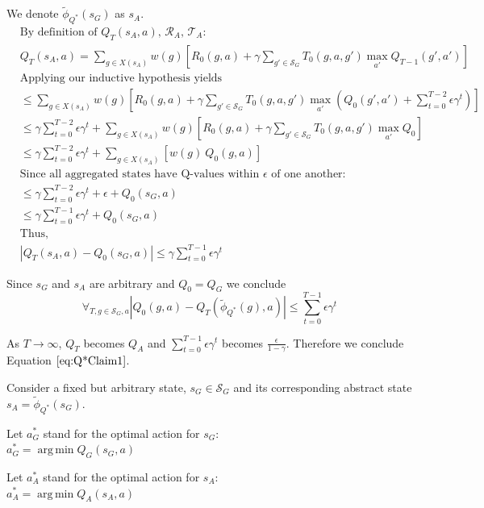 \documentclass{article}
\newcommand{\ep}{\widetilde \phi}
\newcommand{\epQ}{\ep_{Q^*}}
\DeclareMathOperator*{\argmin}{arg\,min}
\begin{document}
We denote $\epQ(s_G)$ as $s_A$.
\begin{align*}
&\text{By definition of $Q_{T}(s_A, a)$, $\mathcal{R}_A$, $\mathcal{T}_A$:}\\
&Q_T(s_A, a) =\sum_{g \in X(s_A)}w(g)\left[ R_0(g,a) + \gamma \sum_{g' \in \mathcal{S}_G} T_0(g,a,g') \max_{a'} Q_{T-1}(g', a')      \right]\\
&\text{Applying our inductive hypothesis yields}\\
&\leq \sum_{g \in X(s_A)}w(g)\left[ R_0(g,a) + \gamma \sum_{g' \in \mathcal{S}_G} T_0(g,a,g') \max_{a'}(Q_0(g', a') + \sum_{t=0}^{T-2} \epsilon \gamma^t)      \right]\\
&\leq \gamma\sum_{t=0}^{T-2} \epsilon \gamma^t + \sum_{g \in X(s_A)}w(g)\left[ R_0(g,a) + \gamma \sum_{g' \in \mathcal{S}_G} T_0(g,a,g') \max_{a'}Q_0      \right]\\
&\leq \gamma\sum_{t=0}^{T-2} \epsilon \gamma^t + \sum_{g \in X(s_A)}\left[ w(g)\ Q_0(g,a)\right]\\
&\text{Since all aggregated states have Q-values within $\epsilon$ of one another:}\\
&\leq \gamma\sum_{t=0}^{T-2} \epsilon \gamma^t + \epsilon + Q_0(s_G, a)\\
&\leq \gamma\sum_{t=0}^{T-1} \epsilon \gamma^t + Q_0(s_G, a)\\
&\text{Thus,}\\
&\left| Q_{T}(s_A, a) - Q_0(s_G,a) \right| \leq \gamma\sum_{t=0}^{T-1}\epsilon \gamma^t
\end{align*}

Since $s_G$ and $s_A$ are arbitrary and $Q_0=Q_G$ we conclude
\begin{equation}
\forall_{T, g \in \mathcal{S}_G, a} |Q_0(g, a) - Q_T(\epQ(g), a)| \leq \sum_{t=0}^{T-1} \epsilon \gamma^t
\end{equation}

As $T \rightarrow \infty$, $Q_T$ becomes $Q_A$ and $\sum_{t=0}^{T-1} \epsilon \gamma^t$ becomes $\frac{\epsilon}{1-\gamma}$. Therefore we conclude Equation $\ref{eq:Q*Claim1}$.

Consider a fixed but arbitrary state, $s_G \in \mathcal{S}_G$ and its corresponding abstract state $s_A=\epQ(s_G)$.

Let $a^*_G$ stand for the optimal action for $s_G$: \\
$a^*_G = \argmin Q_G(s_G, a)$

Let $a^*_A$ stand for the optimal action for $s_A$:\\
 $a^*_A = \argmin Q_A(s_A, a)$
\end{document}
